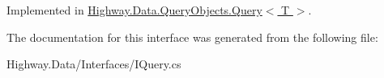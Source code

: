 Implemented in \hyperlink{class_highway_1_1_data_1_1_query_objects_1_1_query-g_a68dd6db173a8ea84d10d72ccc27f74f4}{Highway.\-Data.\-Query\-Objects.\-Query$<$ T $>$}.



The documentation for this interface was generated from the following file\-:\begin{DoxyCompactItemize}
\item 
Highway.\-Data/\-Interfaces/I\-Query.\-cs\end{DoxyCompactItemize}
